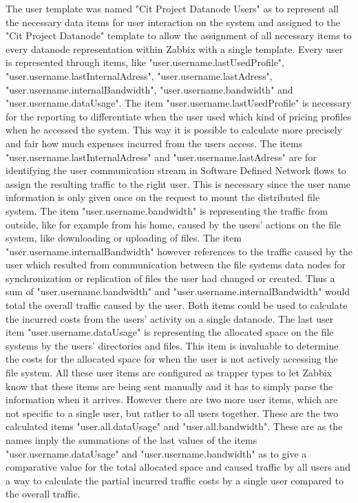 	The user template was named "Cit Project Datanode Users" as to represent all the necessary data items for user interaction on the system and assigned to the "Cit Project Datanode" template to allow the assignment of all necessary items to every datanode representation within Zabbix with a single template. Every user is represented through items, like "user.username.lastUsedProfile", "user.username.lastInternalAdress", "user.username.lastAdress", "user.username.internalBandwidth", "user.username.bandwidth" and "user.username.dataUsage". The item "user.username.lastUsedProfile" is necessary for the reporting to differentiate when the user used which kind of pricing profiles when he accessed the system. This way it is possible to calculate more precisely and fair how much expenses incurred from the users access. The items "user.username.lastInternalAdress" and "user.username.lastAdress" are for identifying the user communication stream in Software Defined Network flows to assign the resulting traffic to the right user. This is necessary since the user name information is only given once on the request to mount the distributed file system. The item "user.username.bandwidth" is representing the traffic from outside, like for example from his home, caused by the users' actions on the file system, like downloading or uploading of files. The item "user.username.internalBandwidth" however references to the traffic caused by the user which resulted from communication between the file systems data nodes for synchronization or replication of files the user had changed or created. Thus a sum of "user.username.bandwidth" and "user.username.internalBandwidth" would total the overall traffic caused by the user. Both items could be used to calculate the incurred costs from the users' activity on a single datanode. The last user item "user.username.dataUsage" is representing the allocated space on the file systems by the users' directories and files. This item is invaluable to determine the costs for the allocated space for when the user is not actively accessing the file system. All these user items are configured as trapper types to let Zabbix know that these items are being sent manually and it has to simply parse the information when it arrives. However there are two more user items, which are not specific to a single user, but rather to all users together. These are the two calculated items "user.all.dataUsage" and "user.all.bandwidth". These are as the names imply the summations of the last values of the items "user.username.dataUsage" and "user.username.bandwidth" as to give a comparative value for the total allocated space and caused traffic by all users and a  way to calculate the partial incurred traffic costs by a single user compared to the overall traffic.
